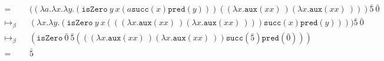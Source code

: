 \documentclass[11pt]{article}
\begin{document}
\begin{enumerate}
\begin{align*}
		      =             &  & (( \lambda a. \lambda x. \lambda y. ( \texttt{isZero} \: y \: x ( a \texttt{succ}(x) \texttt{pred}(y)))(( \lambda x. \texttt{aux}(x x) \:)( \lambda x. \texttt{aux}(x x) \:))) \bar{5} \: \bar{0}  & \\
		      \mapsto_\beta &  & ( \lambda x. \lambda y. ( \texttt{isZero} \: y \: x ((( \lambda x. \texttt{aux}(x x) \:)( \lambda x. \texttt{aux}(x x) \:))) \texttt{succ}(x) \texttt{pred}(y)))) \bar{5} \: \bar{0}               & \\
		      \mapsto_\beta &  & ( \texttt{isZero} \: \bar{0}  \: \bar{5} ((( \lambda x. \texttt{aux}(x x) \:)( \lambda x. \texttt{aux}(x x) \:)) \texttt{succ}( \bar{5} ) \texttt{pred}( \bar{0} )))                               & \\
		      =             &  & \bar{5}
	      \end{align*}

\end{enumerate}
\end{document}
